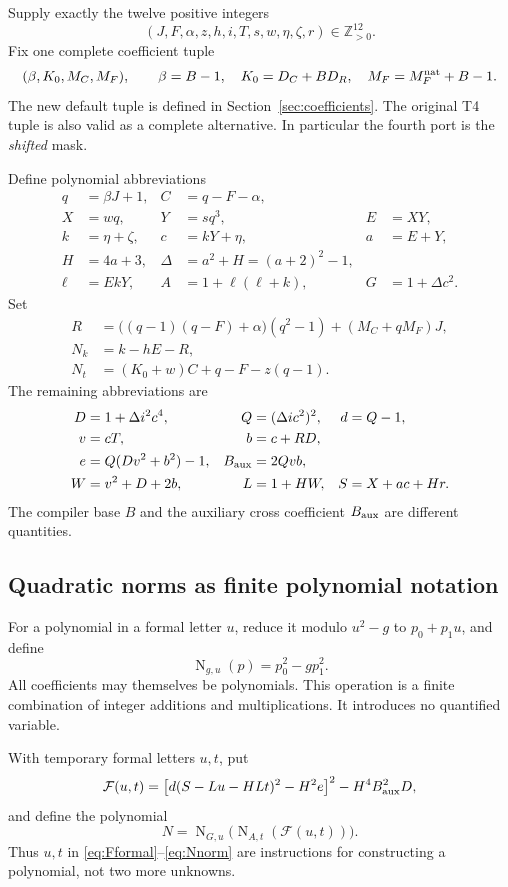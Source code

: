 \documentclass[11pt]{article}
\theoremstyle{remark}\newtheorem{remark}[theorem]{Remark}
\newcommand{\Pos}{\mathbb Z_{>0}}
\newcommand{\Norm}{\operatorname{N}}
\begin{document}
Supply exactly the twelve positive integers
\[
 (J,F,\alpha,z,h,i,T,s,w,\eta,\zeta,r)\in\Pos^{12}.
\]
Fix one complete coefficient tuple
\[
 (\beta,K_0,M_C,M_F),\qquad
 \beta=B-1,\quad K_0=D_C+BD_R,\quad
 M_F=M_F^{\rm nat}+B-1.
\]
The new default tuple is defined in Section~\ref{sec:coefficients}.
The original T4 tuple is also valid as a complete alternative. In
particular the fourth port is the \emph{shifted} mask.

Define polynomial abbreviations
\begin{align*}
 q&=\beta J+1,& C&=q-F-\alpha,\\
 X&=wq,&Y&=sq^3,&E&=XY,\\
 k&=\eta+\zeta,&c&=kY+\eta,&a&=E+Y,\\
 H&=4a+3,&\Delta&=a^2+H=(a+2)^2-1,\\
 \ell&=EkY,&A&=1+\ell(\ell+k),&
 G&=1+\Delta c^2.
\end{align*}
Set
\begin{align}
 R&=\bigl((q-1)(q-F)+\alpha\bigr)(q^2-1)
                  +(M_C+qM_F)J,\label{eq:R}\\
 N_k&=k-hE-R,\label{eq:Nk}\\
 N_t&=(K_0+w)C+q-F-z(q-1).\label{eq:Nt}
\end{align}
The remaining abbreviations are
\begin{align*}
 D&=1+\Delta i^2c^4,&Q&=(\Delta ic^2)^2,&d&=Q-1,\\
 v&=cT,&b&=c+RD,\\
 e&=Q(Dv^2+b^2)-1,&B_{\rm aux}&=2Qvb,\\
 W&=v^2+D+2b,&L&=1+HW,&S&=X+ac+Hr.
\end{align*}
The compiler base \(B\) and the auxiliary cross coefficient
\(B_{\rm aux}\) are different quantities.

\subsection{Quadratic norms as finite polynomial notation}

For a polynomial in a formal letter \(u\), reduce it modulo \(u^2-g\)
to \(p_0+p_1u\), and define
\[
 \Norm_{g,u}(p)=p_0^2-gp_1^2.
\]
All coefficients may themselves be polynomials. This operation is a
finite combination of integer additions and multiplications. It
introduces no quantified variable.

With temporary formal letters \(u,t\), put
\begin{equation}\label{eq:Fformal}
 \mathcal F(u,t)=
 \bigl[d(S-Lu-HLt)^2-H^2e\bigr]^2-H^4B_{\rm aux}^2D,
\end{equation}
and define the polynomial
\begin{equation}\label{eq:Nnorm}
 N=\Norm_{G,u}\bigl(\Norm_{A,t}(\mathcal F(u,t))\bigr).
\end{equation}
Thus \(u,t\) in \eqref{eq:Fformal}--\eqref{eq:Nnorm} are instructions
for constructing a polynomial, not two more unknowns.
\end{document}
